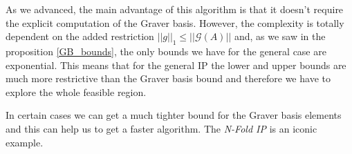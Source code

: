 As we advanced, the main advantage of this algorithm is that it doesn't require the explicit computation of the Graver basis. However, the complexity is totally dependent on the added restriction $||g||_1 \leq ||\mathcal{G}(A)||$ and, as we saw in the proposition \ref{GB_bounds}, the only bounds we have for the general case are exponential. This means that for the general IP the lower and upper bounds are much more restrictive than the Graver basis bound and therefore we have to explore the whole feasible region.

In certain cases we can get a much tighter bound for the Graver basis elements and this can help us to get a faster algorithm. The \emph{N-Fold IP} is an iconic example.